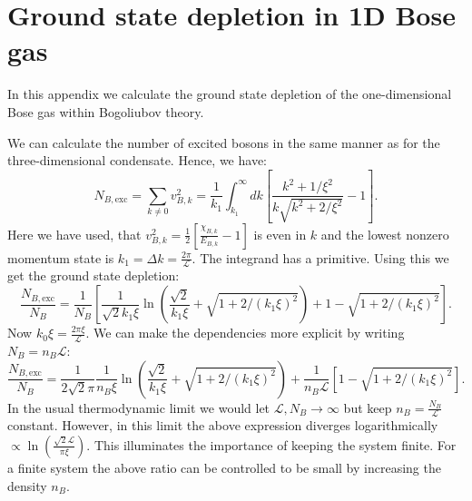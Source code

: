 \chapter{Ground state depletion in 1D Bose gas} %

\label{Appendix.groundstatedeltion.1DBosegas} 

In this appendix we calculate the ground state depletion of the one-dimensional Bose gas within Bogoliubov theory. 

We can calculate the number of excited bosons in the same manner as for the three-dimensional condensate. Hence, we have:
\begin{equation}
N_{B,\text{exc}} = \sum_{k\neq 0} v_{B,k}^2 = \frac{1}{k_1}\int_{k_1}^{\infty} dk \left[ \frac{k^2 + 1/\xi^2}{k\sqrt{k^2 + 2/\xi^2}} - 1 \right]. \nonumber
\end{equation}
Here we have used, that $v_{B,k}^2 = \frac{1}{2}\left[\frac{\chi_{B,k}}{E_{B,k}} - 1 \right]$ is even in $k$ and the lowest nonzero momentum state is $k_1 = \Delta k = \frac{2\pi}{\mathcal{L}}$. The integrand has a primitive. Using this we get the ground state depletion:
\begin{equation}
\frac{N_{B,\text{exc}}}{N_B} = \frac{1}{N_B}\left[\frac{1}{\sqrt{2}k_1\xi}\ln\left( \frac{ \sqrt{2} }{ k_1\xi } + \sqrt{ 1 + 2/(k_1\xi)^2 }\right) + 1 - \sqrt{ 1 + 2/(k_1\xi)^2 } \right]. \nonumber
\end{equation}
Now $k_0\xi = \frac{2\pi \xi}{\mathcal{L}}$. We can make the dependencies more explicit by writing $N_B = n_B \mathcal{L}$:
\begin{equation}
\frac{N_{B,\text{exc}}}{N_B} = \frac{1}{2\sqrt{2}\pi}\frac{1}{n_B\xi}\ln\left( \frac{ \sqrt{2} }{ k_1\xi } + \sqrt{ 1 + 2/(k_1\xi)^2 }\right) + \frac{1}{n_B\mathcal{L}}\left[1 - \sqrt{ 1 + 2/(k_1\xi)^2 } \right].
\label{eq.groundstatedepletion.1Dbosegas}
\end{equation}
In the usual thermodynamic limit we would let $\mathcal{L}, N_B \to \infty$ but keep $n_B = \frac{N_B}{\mathcal{L}}$ constant. However, in this limit the above expression diverges logarithmically $\propto \ln\left(\frac{\sqrt{2}\mathcal{L}}{\pi\xi} \right)$. This illuminates the importance of keeping the system finite. For a finite system the above ratio can be controlled to be small by increasing the density $n_B$. 
